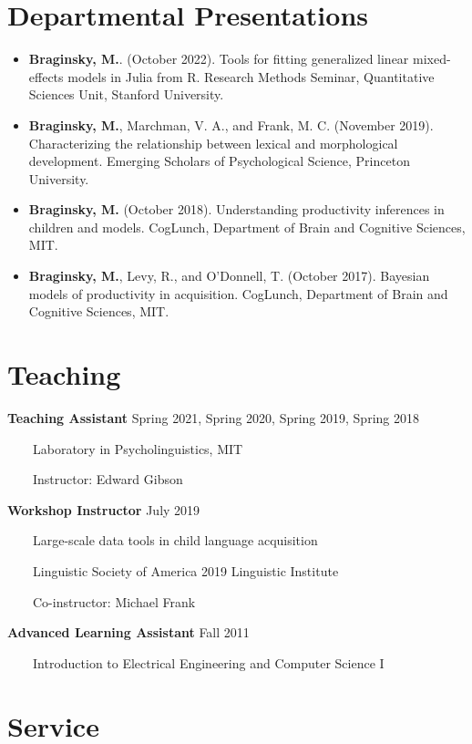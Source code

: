 \documentclass[11pt,]{article}
\begin{document}
\section{Departmental Presentations}\label{departmental-presentations}

\begin{itemize}
\item
  \textbf{Braginsky, M.}. (October 2022). Tools for fitting generalized
  linear mixed-effects models in Julia from R. Research Methods Seminar,
  Quantitative Sciences Unit, Stanford University.
\item
  \textbf{Braginsky, M.}, Marchman, V. A., and Frank, M. C. (November
  2019). Characterizing the relationship between lexical and
  morphological development. Emerging Scholars of Psychological Science,
  Princeton University.
\item
  \textbf{Braginsky, M.} (October 2018). Understanding productivity
  inferences in children and models. CogLunch, Department of Brain and
  Cognitive Sciences, MIT.
\item
  \textbf{Braginsky, M.}, Levy, R., and O'Donnell, T. (October 2017).
  Bayesian models of productivity in acquisition. CogLunch, Department
  of Brain and Cognitive Sciences, MIT.
\end{itemize}

\section{Teaching}\label{teaching}

\textbf{Teaching Assistant} \hfill Spring 2021, Spring 2020, Spring
2019, Spring 2018\\
\strut ~~~~Laboratory in Psycholinguistics, MIT\\
\strut ~~~~Instructor: Edward Gibson

\textbf{Workshop Instructor} \hfill July 2019\\
\strut ~~~~Large-scale data tools in child language acquisition\\
\strut ~~~~Linguistic Society of America 2019 Linguistic Institute\\
\strut ~~~~Co-instructor: Michael Frank

\textbf{Advanced Learning Assistant} \hfill Fall 2011\\
\strut ~~~~Introduction to Electrical Engineering and Computer Science I

\section{Service}\label{service}
\end{document}
